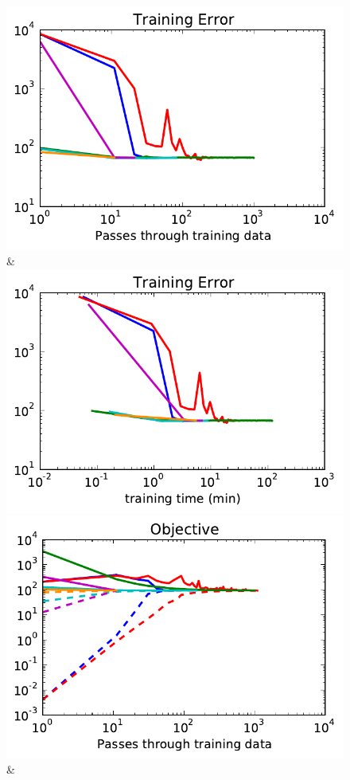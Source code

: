 \begin{figure}
\begin{tabu}
    \includegraphics[width=\linewidth]{evaluation/images/msrc_loss}&%
    \includegraphics[width=\linewidth]{evaluation/images/msrc_time_loss}\\
    \includegraphics[width=\linewidth]{evaluation/images/pascal}&%

\end{tabu}
\end{figure}
